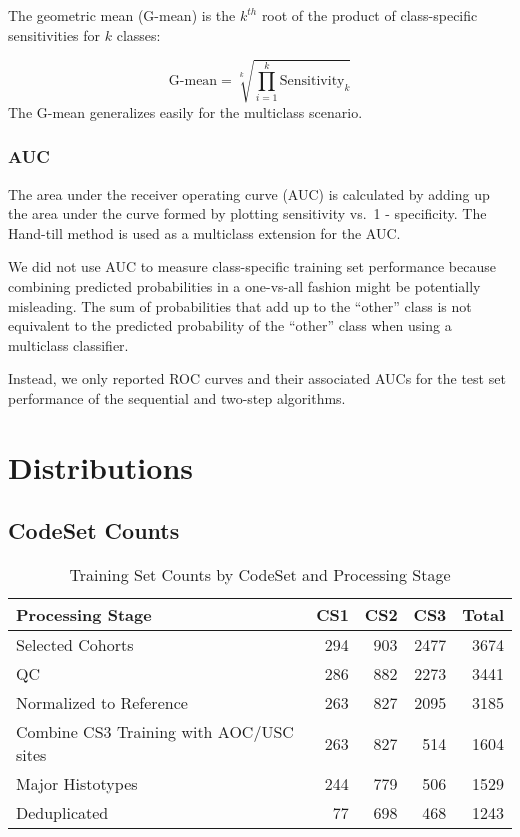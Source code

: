 \documentclass[
]{report}
\begin{document}
The geometric mean (G-mean) is the \(k^{th}\) root of the product of class-specific sensitivities for \(k\) classes:

\[
\text{G-mean} = \sqrt[k]{\prod_{i=1}^{k}{\text{Sensitivity}_k}}
\label{eq:gmean}
\] The G-mean generalizes easily for the multiclass scenario.

\subsection{AUC}\label{auc}

The area under the receiver operating curve (AUC) is calculated by adding up the area under the curve formed by plotting sensitivity vs.~1 - specificity. The Hand-till method is used as a multiclass extension for the AUC.

We did not use AUC to measure class-specific training set performance because combining predicted probabilities in a one-vs-all fashion might be potentially misleading. The sum of probabilities that add up to the ``other'' class is not equivalent to the predicted probability of the ``other'' class when using a multiclass classifier.

Instead, we only reported ROC curves and their associated AUCs for the test set performance of the sequential and two-step algorithms.

\chapter{Distributions}\label{distributions}

\section{CodeSet Counts}\label{codeset-counts}

\begin{table}

\caption{\label{tab:codeset-counts}Training Set Counts by CodeSet and Processing Stage}
\centering
\begin{tabular}[t]{l|r|r|r|r}
\hline
Processing Stage & CS1 & CS2 & CS3 & Total\\
\hline
Selected Cohorts & 294 & 903 & 2477 & 3674\\
\hline
QC & 286 & 882 & 2273 & 3441\\
\hline
Normalized to Reference & 263 & 827 & 2095 & 3185\\
\hline
Combine CS3 Training with AOC/USC sites & 263 & 827 & 514 & 1604\\
\hline
Major Histotypes & 244 & 779 & 506 & 1529\\
\hline
Deduplicated & 77 & 698 & 468 & 1243\\
\hline
\end{tabular}
\end{table}
\end{document}
